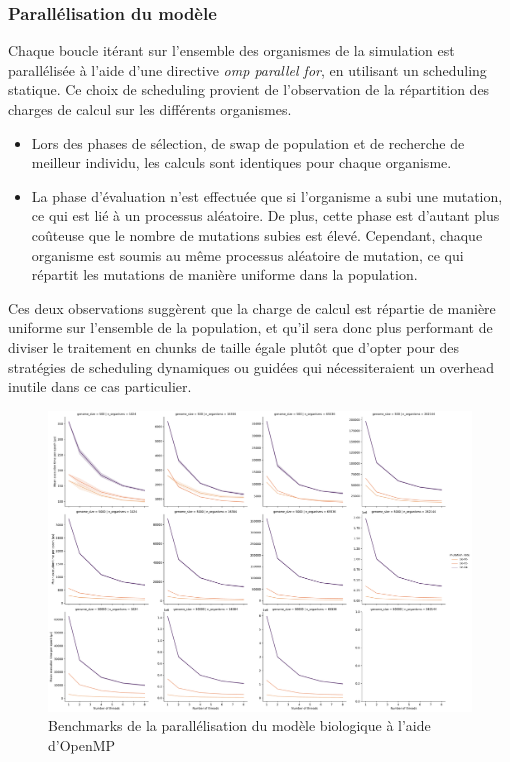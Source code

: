 \documentclass[a4paper, 10pt, twoside]{article}
\begin{document}
\subsubsection{Parallélisation du modèle}

Chaque boucle itérant sur l'ensemble des organismes de la simulation est parallélisée à l'aide d'une directive \textit{omp parallel for}, en utilisant un scheduling statique. Ce choix de scheduling provient de l'observation de la répartition des charges de calcul sur les différents organismes.

\begin{itemize}
	\item Lors des phases de sélection, de swap de population et de recherche de meilleur individu, les calculs sont identiques pour chaque organisme.
	\item La phase d'évaluation n'est effectuée que si l'organisme a subi une mutation, ce qui est lié à un processus aléatoire. De plus, cette phase est d'autant plus coûteuse que le nombre de mutations subies est élevé. Cependant, chaque organisme est soumis au même processus aléatoire de mutation, ce qui répartit les mutations de manière uniforme dans la population.
\end{itemize}

Ces deux observations suggèrent que la charge de calcul est répartie de manière uniforme sur l'ensemble de la population, et qu'il sera donc plus performant de diviser le traitement en chunks de taille égale plutôt que d'opter pour des stratégies de scheduling dynamiques ou guidées qui nécessiteraient un overhead inutile dans ce cas particulier.

\begin{figure}[htb]
	\centering
	\includegraphics[width=0.7\linewidth]{img/benchmark_omp_static.pdf}
	\caption{Benchmarks de la parallélisation du modèle biologique à l'aide d'OpenMP}
	\label{fig:benchmarks/omp}
\end{figure}
\end{document}
